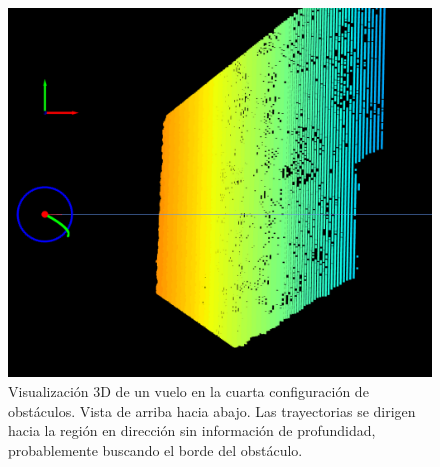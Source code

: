 \begin{figure}[H]
    \centering
    \includegraphics[scale=0.25]{partes/ImgJoao/depth-wall-2-top.png}
    \caption[Visualización 3D de un vuelo en la cuarta configuración de obstáculos. Vista de arriba hacia abajo. Búsqueda del borde del obstáculo (1).]{Visualización 3D de un vuelo en la cuarta configuración de obstáculos. Vista de arriba hacia abajo. Las trayectorias se dirigen hacia la región en dirección  sin información de profundidad, probablemente buscando el borde del obstáculo.}
    \label{depth-wall-2}
\end{figure}

